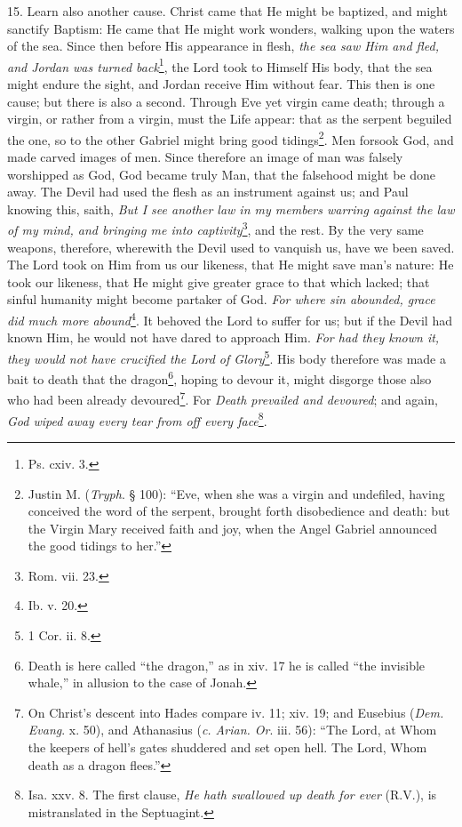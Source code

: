 15. Learn also another cause. Christ came that He might be baptized, and might sanctify Baptism: He came that He might work wonders, walking upon the waters of the sea. Since then before His appearance in flesh, \emph{the sea saw Him and fled, and Jordan was turned back}\footnote{Ps. cxiv. 3.}, the Lord took to Himself His body, that the sea might endure the sight, and Jordan receive Him without fear. This then is one cause; but there is also a second. Through Eve yet virgin came death; through a virgin, or rather from a virgin, must the Life appear: that as the serpent beguiled the one, so to the other Gabriel might bring good tidings\footnote{Justin M. (\emph{Tryph}. § 100): “Eve, when she was a virgin and undefiled, having conceived the word of the serpent, brought forth disobedience and death: but the Virgin Mary received faith and joy, when the Angel Gabriel announced the good tidings to her.”}. Men forsook God, and made carved images of men. Since therefore an image of man was falsely worshipped as God, God became truly Man, that the falsehood might be done away. The Devil had used the flesh as an instrument against us; and Paul knowing this, saith, \emph{But I see another law in my members warring against the law of my mind, and bringing me into captivity}\footnote{Rom. vii. 23.}, and the rest. By the very same weapons, therefore, wherewith the Devil used to vanquish us, have we been saved. The Lord took on Him from us our likeness, that He might save man’s nature: He took our likeness, that He might give greater grace to that which lacked; that sinful humanity might become partaker of God. \emph{For where sin abounded, grace did much more abound}\footnote{Ib. v. 20.}. It behoved the Lord to suffer for us; but if the Devil had known Him, he would not have dared to approach Him. \emph{For had they known it, they would not have crucified the Lord of Glory}\footnote{1 Cor. ii. 8.}. His body therefore was made a bait to death that the dragon\footnote{Death is here called “the dragon,” as in xiv. 17 he is called “the invisible whale,” in allusion to the case of Jonah.}, hoping to devour it, might disgorge those also who had been already devoured\footnote{On Christ’s descent into Hades compare iv. 11; xiv. 19; and Eusebius (\emph{Dem. Evang}. x. 50), and Athanasius (\emph{c. Arian. Or}. iii. 56): “The Lord, at Whom the keepers of hell’s gates shuddered and set open hell. The Lord, Whom death as a dragon flees.”}. For \emph{Death prevailed and devoured}; and again, \emph{God wiped away every tear from off every face}\footnote{Isa. xxv. 8. The first clause, \emph{He hath swallowed up death for ever} (R.V.), is mistranslated in the Septuagint.}.

